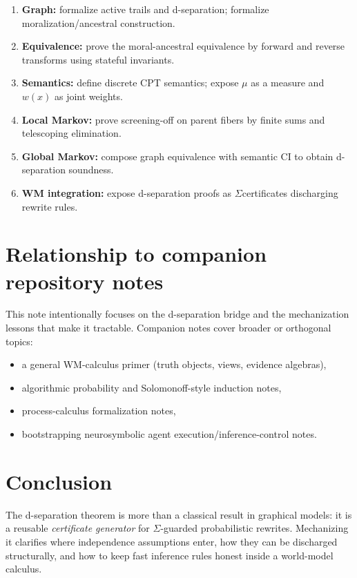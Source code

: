 \documentclass[11pt]{article}
\newcommand{\side}{\ensuremath{\Sigma}}
\begin{document}
\begin{enumerate}[leftmargin=2em]
\item \textbf{Graph:} formalize active trails and d-separation; formalize moralization/ancestral construction.
\item \textbf{Equivalence:} prove the moral-ancestral equivalence by forward and reverse transforms using stateful invariants.
\item \textbf{Semantics:} define discrete CPT semantics; expose $\mu$ as a measure and $w(x)$ as joint weights.
\item \textbf{Local Markov:} prove screening-off on parent fibers by finite sums and telescoping elimination.
\item \textbf{Global Markov:} compose graph equivalence with semantic CI to obtain d-separation soundness.
\item \textbf{WM integration:} expose d-separation proofs as \side certificates discharging rewrite rules.
\end{enumerate}

\section{Relationship to companion repository notes}

This note intentionally focuses on the d-separation bridge and the mechanization lessons that make it tractable.
Companion notes cover broader or orthogonal topics:
\begin{itemize}[leftmargin=2em]
\item a general WM-calculus primer (truth objects, views, evidence algebras),
\item algorithmic probability and Solomonoff-style induction notes,
\item process-calculus formalization notes,
\item bootstrapping neurosymbolic agent execution/inference-control notes.
\end{itemize}

\section{Conclusion}

The d-separation theorem is more than a classical result in graphical models:
it is a reusable \emph{certificate generator} for \side-guarded probabilistic rewrites.
Mechanizing it clarifies where independence assumptions enter, how they can be discharged structurally,
and how to keep fast inference rules honest inside a world-model calculus.
\end{document}
